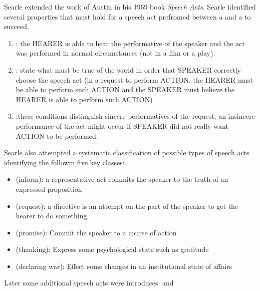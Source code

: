 Searle extended the work of Austin in his 1969 book \emph{Speech Acts}.
Searle identified several properties that must hold for a speech act prefromed between a  and a  to succeed.
\begin{enumerate}
\item {}: the HEARER is able to hear the performative of the speaker and the act was performed in normal circumstances (not in a film or a play).
\item {}: state what must be true of the world in order that SPEAKER correctly choose the speech act (in a request to perform ACTION, the HEARER must be able to perform such ACTION and the SPEAKER must believe the HEARER is able to perform such ACTION)
\item {}:these conditions distinguish sincere performatives of the request; an insincere performance of the act might occur if SPEAKER did not really want ACTION to be performed.
\end{enumerate}

Searle also attempted a systematic classification of possible types of speech acts identifying the followin five key classes:
\begin{itemize}
\item {} (inform): a representative act commits the speaker to the truth of an expressed proposition
\item {} (request): a directive is an attempt on the part of the speaker to get the hearer to do something
\item {} (promise): Commit the speaker to a course of action
\item {} (thanking): Express some psychological state such as gratitude
\item {} (declaring war): Effect some changes in an institutional state of affairs
\end{itemize}
Later some additional speech acts were introduces:  and 

